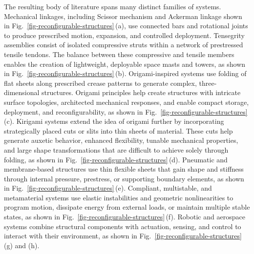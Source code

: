 The resulting body of literature spans many distinct families of systems. Mechanical linkages, including Scissor mechanism and Ackerman linkage shown in Fig.~\ref{fig-reconfigurable-structures}\,(a), use connected bars and rotational joints to produce prescribed motion, expansion, and controlled deployment. Tensegrity assemblies consist of isolated compressive struts within a network of prestressed tensile tendons. The balance between these compressive and tensile members enables the creation of lightweight, deployable space masts and towers, as shown in Fig.~\ref{fig-reconfigurable-structures}\,(b). Origami-inspired systems use folding of flat sheets along prescribed crease patterns to generate complex, three-dimensional structures. Origami principles help create structures with intricate surface topologies, architected mechanical responses, and enable compact storage, deployment, and reconfigurability, as shown in Fig.~\ref{fig-reconfigurable-structures}\,(c). Kirigami systems extend the idea of origami further by incorporating strategically placed cuts or slits into thin sheets of material. These cuts help generate auxetic behavior, enhanced flexibility, tunable mechanical properties, and large shape transformations that are difficult to achieve solely through folding, as shown in Fig.~\ref{fig-reconfigurable-structures}\,(d). Pneumatic and membrane-based structures use thin flexible sheets that gain shape and stiffness through internal pressure, prestress, or supporting boundary elements, as shown in Fig.~\ref{fig-reconfigurable-structures}\,(e). Compliant, multistable, and metamaterial systems use elastic instabilities and geometric nonlinearities to program motion, dissipate energy from external loads, or maintain multiple stable states, as shown in Fig.~\ref{fig-reconfigurable-structures}\,(f). Robotic and aerospace systems combine structural components with actuation, sensing, and control to interact with their environment, as shown in Fig.~\ref{fig-reconfigurable-structures}\,(g) and (h).

